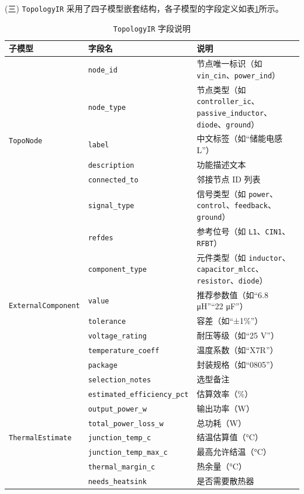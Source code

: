 (三) \texttt{TopologyIR} 采用了四子模型嵌套结构，各子模型的字段定义如表\ref{tab:topoir}所示。
\begin{table}[H]
\centering
\caption{\texttt{TopologyIR} 字段说明}
\label{tab:topoir}
\footnotesize
\setlength{\tabcolsep}{4pt}
\renewcommand{\arraystretch}{0.9}
\begin{tabularx}{\textwidth}{p{3.2cm}p{4.5cm}X}
\toprule
\textbf{子模型} & \textbf{字段名} & \textbf{说明} \\
\midrule
\multirow{6}{*}{\texttt{TopoNode}}
& \texttt{node\_id} & 节点唯一标识（如 \texttt{vin\_cin}、\texttt{power\_ind}） \\
& \texttt{node\_type} & 节点类型（如 \texttt{controller\_ic}、\texttt{passive\_inductor}、\texttt{diode}、\texttt{ground}） \\
& \texttt{label} & 中文标签（如“储能电感 L”） \\
& \texttt{description} & 功能描述文本 \\
& \texttt{connected\_to} & 邻接节点 ID 列表 \\
& \texttt{signal\_type} & 信号类型（如 \texttt{power}、\texttt{control}、\texttt{feedback}、\texttt{ground}） \\
\midrule

\multirow{8}{*}{\texttt{ExternalComponent}}
& \texttt{refdes} & 参考位号（如 \texttt{L1}、\texttt{CIN1}、\texttt{RFBT}） \\
& \texttt{component\_type} & 元件类型（如 \texttt{inductor}、\texttt{capacitor\_mlcc}、\texttt{resistor}、\texttt{diode}） \\
& \texttt{value} & 推荐参数值（如“6.8 μH”“22 μF”） \\
& \texttt{tolerance} & 容差（如“±1\%”） \\
& \texttt{voltage\_rating} & 耐压等级（如“25 V”） \\
& \texttt{temperature\_coeff} & 温度系数（如“X7R”） \\
& \texttt{package} & 封装规格（如“0805”） \\
& \texttt{selection\_notes} & 选型备注 \\
\midrule

\multirow{7}{*}{\texttt{ThermalEstimate}}
& \texttt{estimated\_efficiency\_pct} & 估算效率（\%） \\
& \texttt{output\_power\_w} & 输出功率（W） \\
& \texttt{total\_power\_loss\_w} & 总功耗（W） \\
& \texttt{junction\_temp\_c} & 结温估算值（°C） \\
& \texttt{junction\_temp\_max\_c} & 最高允许结温（°C） \\
& \texttt{thermal\_margin\_c} & 热余量（°C） \\
& \texttt{needs\_heatsink} & 是否需要散热器 \\
\bottomrule
\end{tabularx}
\end{table}

